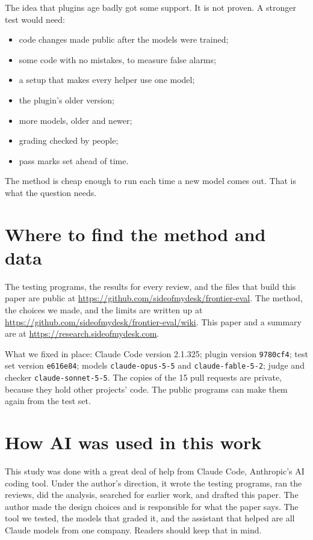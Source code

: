 \documentclass[11pt]{article}
\begin{document}
The idea that plugins age badly got some support. It is not proven. A stronger test would need:
\begin{itemize}
\item code changes made public after the models were trained;
\item some code with no mistakes, to measure false alarms;
\item a setup that makes every helper use one model;
\item the plugin's older version;
\item more models, older and newer;
\item grading checked by people;
\item pass marks set ahead of time.
\end{itemize}
The method is cheap enough to run each time a new model comes out. That is what the question needs.

\section*{Where to find the method and data}

The testing programs, the results for every review, and the files that build this paper are public at \url{https://github.com/sideofmydesk/frontier-eval}. The method, the choices we made, and the limits are written up at \url{https://github.com/sideofmydesk/frontier-eval/wiki}. This paper and a summary are at \url{https://research.sideofmydesk.com}.

What we fixed in place: Claude Code version 2.1.325; plugin version \texttt{9780cf4}; test set version \texttt{e616e84}; models \texttt{claude-opus-5-5} and \texttt{claude-fable-5-2}; judge and checker \texttt{claude-sonnet-5-5}. The copies of the 15 pull requests are private, because they hold other projects' code. The public programs can make them again from the test set.

\section*{How AI was used in this work}

This study was done with a great deal of help from Claude Code, Anthropic's AI coding tool. Under the author's direction, it wrote the testing programs, ran the reviews, did the analysis, searched for earlier work, and drafted this paper. The author made the design choices and is responsible for what the paper says. The tool we tested, the models that graded it, and the assistant that helped are all Claude models from one company. Readers should keep that in mind.
\end{document}
